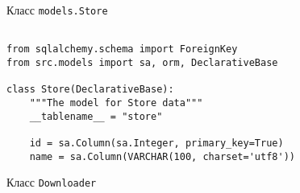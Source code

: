 \begin{center}Класс \texttt{models.Store}\end{center}

\begin{lstlisting}[style=app]

from sqlalchemy.schema import ForeignKey
from src.models import sa, orm, DeclarativeBase

class Store(DeclarativeBase):
    """The model for Store data"""
    __tablename__ = "store"

    id = sa.Column(sa.Integer, primary_key=True)
    name = sa.Column(VARCHAR(100, charset='utf8'))

\end{lstlisting}

\begin{center}Класс \texttt{Downloader}\end{center}

